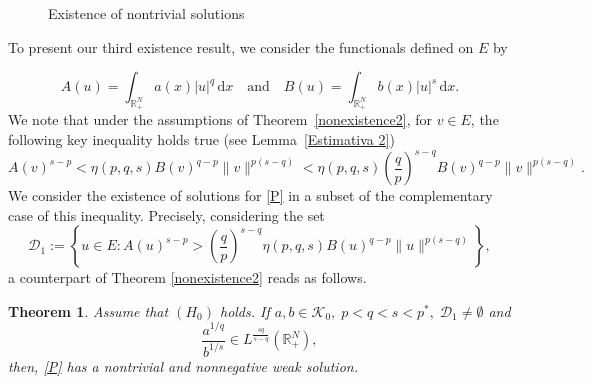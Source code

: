 \documentclass[12pt,reqno]{amsart}
\newtheorem{theorem}{Theorem}[section]
\begin{document}
\begin{figure}[h]
    \centering
{}
    \caption{Existence of nontrivial solutions}
    \label{fig:enter-label}
\end{figure}



To present our third existence result, we consider the functionals defined on $E$ by

\begin{equation}\label{FuntionalAB}
A(u)=\int_{\mathds{R}^N_+}a(x)|u|^q\, \mathrm{d} x\quad\text{and}\quad B(u)=\int_{\mathds{R}^N_+}b(x)|u|^s\, \mathrm{d} x.
 \end{equation}
We note that under the assumptions of Theorem~\ref{nonexistence2}, for $v\in E$, the following key inequality holds true  (see Lemma~\ref{Estimativa 2})
$$
A(v)^{s-p}<\eta(p,q,s)B(v)^{q-p}\|v\|^{p(s-q)}<\eta(p,q,s)\left(\frac{q}{p}\right)^{s-q} B(v)^{q-p}\|v\|^{p(s-q)}.
$$
We consider the existence of solutions for \eqref{P} in a subset of the complementary case of this inequality. 
Precisely, considering the set 
\begin{equation}\label{D hypothesis}
\mathcal{D}_1:= \left\{u \in E: A(u)^{s-p}>\left(\frac{q}{p}\right)^{s-q}\eta(p,q,s)B(u)^{q-p}\|u\|^{p(s-q)}\right\},
\end{equation}
a counterpart of Theorem \ref{nonexistence2} reads as follows.

\begin{theorem}\label{Terceiro Exitencia} 
Assume that $(H_0)$ holds. If $a,b\in \mathcal{K}_0, \; p<q<s<p^*, \; \mathcal{D}_1 \neq\emptyset$ and
\begin{equation}\label{ab condition}
\frac{a^{1/q}}{b^{1/s}}\in L^{\frac{sq}{s-q}}(\mathds{R}_+^N),
\end{equation}
then, \eqref{P} has a nontrivial and nonnegative weak solution.
\end{theorem}
\end{document}

